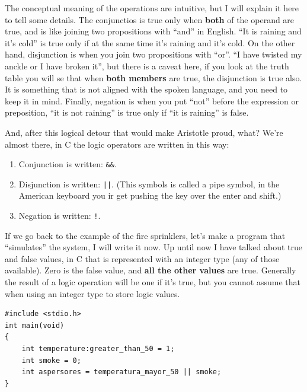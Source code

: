 \documentclass[a4paper]{article}
\begin{document}
The conceptual meaning of the operations are intuitive, but I will explain it
here to tell some details. The conjunctios is true only when \textbf{both}
of the operand are true, and is like joining two propositions with ``and'' in
English. ``It is raining and it's cold'' is true only if at the same time it's
raining and it's cold. On the other hand, disjunction is when you join two
propositions with ``or''. ``I have twisted my anckle or I have broken it'', but
there is a caveat here, if you look at the truth table you will se that when
\textbf{both members}  are true, the disjunction is true also. It is something
that is not aligned with the spoken language, and you need to keep it in mind.
Finally, negation is when you put ``not'' before the expression or preposition,
``it is not raining'' is true only if ``it is raining'' is false.

And, after this logical detour that would make Aristotle proud, what?
We're almost there, in C the logic operators are written in this way:
\begin{enumerate}
    \item Conjunction is written: \verb!&&!.
    \item Disjunction is written: \verb!||!. (This symbols is called a pipe
    symbol, in the American keyboard you ir get pushing the key over the enter
    and shift.)
    \item Negation is written: \verb"!".
\end{enumerate}

If we go back to the example of the fire sprinklers, let's make a program that
``simulates'' the system, I will write it now.
Up until now I have talked about true and false values, in C that is represented
with an integer type (any of those available). Zero is the false value, and
\textbf{all the other values} are true. Generally the result of a logic
operation will be one if it's true, but you cannot assume that when using
an integer type to store logic values.

\noindent
\begin{minipage}[H]{\linewidth}
\mbox{}
\begin{lstlisting}[style=C,
caption={First program with logic operations},
label={lst:firstLogicProgram}]
#include <stdio.h>
int main(void)
{
    int temperature:greater_than_50 = 1;
    int smoke = 0;
    int aspersores = temperatura_mayor_50 || smoke;
}
\end{lstlisting}
\end{minipage}
\end{document}
